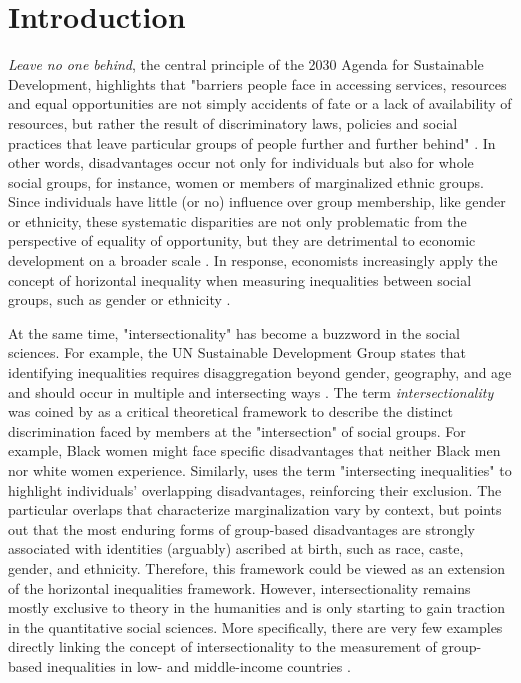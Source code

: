 \hypertarget{introduction}{%
\section{Introduction}\label{sec:introduction_ed}}

\textit{Leave no one behind}, the central principle of the 2030 Agenda for Sustainable Development, highlights that "barriers people face in accessing services, resources and equal opportunities are not simply accidents of fate or a lack of availability of resources, but rather the result of discriminatory laws, policies and social practices that leave particular groups of people further and further behind" \citep{UNSDG2022}. In other words, disadvantages occur not only for individuals but also for whole social groups, for instance, women or members of marginalized ethnic groups. Since individuals have little (or no) influence over group membership, like gender or ethnicity, these systematic disparities are not only problematic from the perspective of equality of opportunity, but they are detrimental to economic development on a broader scale \citep{Ferreira2018, Marrero2013}. In response, economists increasingly apply the concept of horizontal inequality when measuring inequalities between social groups, such as gender or ethnicity \citep{Mancini2008}. 

At the same time, "intersectionality" has become a buzzword in the social sciences. For example, the UN Sustainable Development Group states that identifying inequalities requires disaggregation beyond gender, geography, and age and should occur in multiple and intersecting ways \citep{UNSDG2022}. The term \textit{intersectionality} was coined by \cite{Crenshaw1989, Crenshaw1991} as a critical theoretical framework to describe the distinct discrimination faced by members at the "intersection" of social groups. For example, Black women might face specific disadvantages that neither Black men nor white women experience. Similarly, \cite{Kabeer2016} uses the term "intersecting inequalities" to highlight individuals' overlapping disadvantages, reinforcing their exclusion. The particular overlaps that characterize marginalization vary by context, but \cite{Kabeer2016} points out that the most enduring forms of group-based disadvantages are strongly associated with identities (arguably) ascribed at birth, such as race, caste, gender, and ethnicity. Therefore, this framework could be viewed as an extension of the horizontal inequalities framework. However, intersectionality remains mostly exclusive to theory in the humanities and is only starting to gain traction in the quantitative social sciences. More specifically, there are very few examples directly linking the concept of intersectionality to the measurement of group-based inequalities in low- and middle-income countries \citep[see, e.g.,][]{Kabeer2023, Lenhardt2015}.

